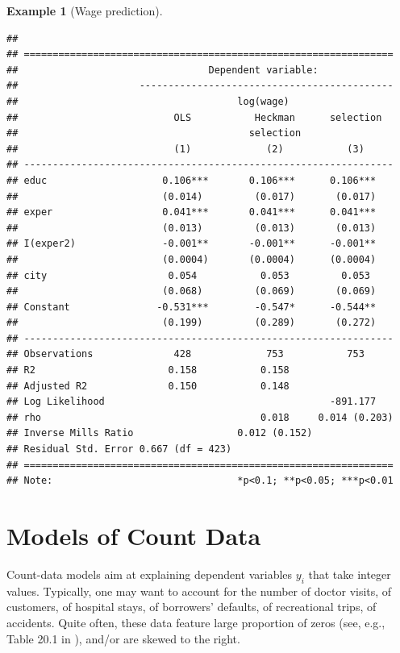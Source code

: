 \documentclass[
  12pt,
]{book}
\theoremstyle{definition}
\theoremstyle{definition}
\newtheorem{example}{Example}[chapter]
\theoremstyle{definition}
\theoremstyle{definition}
\theoremstyle{remark}
\begin{document}
\begin{example}[Wage prediction]
\begin{verbatim}
## 
## ================================================================
##                                 Dependent variable:             
##                     --------------------------------------------
##                                      log(wage)                  
##                           OLS           Heckman      selection  
##                                        selection                
##                           (1)             (2)           (3)     
## ----------------------------------------------------------------
## educ                    0.106***       0.106***      0.106***   
##                         (0.014)         (0.017)       (0.017)   
## exper                   0.041***       0.041***      0.041***   
##                         (0.013)         (0.013)       (0.013)   
## I(exper2)               -0.001**       -0.001**      -0.001**   
##                         (0.0004)       (0.0004)      (0.0004)   
## city                     0.054           0.053         0.053    
##                         (0.068)         (0.069)       (0.069)   
## Constant               -0.531***        -0.547*      -0.544**   
##                         (0.199)         (0.289)       (0.272)   
## ----------------------------------------------------------------
## Observations              428             753           753     
## R2                       0.158           0.158                  
## Adjusted R2              0.150           0.148                  
## Log Likelihood                                       -891.177   
## rho                                      0.018     0.014 (0.203)
## Inverse Mills Ratio                  0.012 (0.152)              
## Residual Std. Error 0.667 (df = 423)                            
## ================================================================
## Note:                                *p<0.1; **p<0.05; ***p<0.01
\end{verbatim}

\end{example}

\hypertarget{models-of-count-data}{%
\section{Models of Count Data}\label{models-of-count-data}}

Count-data models aim at explaining dependent variables \(y_i\) that take integer values. Typically, one may want to account for the number of doctor visits, of customers, of hospital stays, of borrowers' defaults, of recreational trips, of accidents. Quite often, these data feature large proportion of zeros (see, e.g., Table 20.1 in \citet{Cameron_Trivedi_2005}), and/or are skewed to the right.
\end{document}
